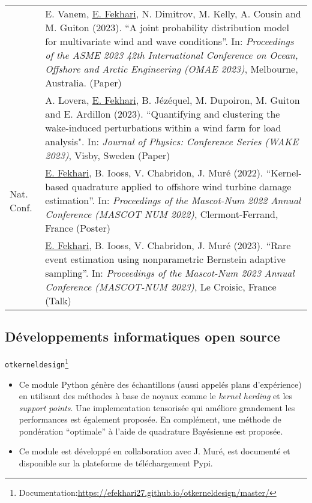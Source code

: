 \begin{center}
\begin{tabularx}{\textwidth}{l X}
                    & E. Vanem, \underline{E. Fekhari}, N. Dimitrov, M. Kelly, A. Cousin and M. Guiton (2023). 
                    ``A joint probability distribution model for multivariate wind and wave conditions''.
                    In: \textit{Proceedings of the ASME 2023 42th International Conference on Ocean, Offshore and Arctic Engineering (OMAE 2023)}, Melbourne, Australia. (Paper)\\
        
                    & A. Lovera, \underline{E. Fekhari}, B. Jézéquel, M. Dupoiron, M. Guiton and E. Ardillon (2023). 
                    ``Quantifying and clustering the wake-induced perturbations within a wind farm for load analysis". 
                    In: \textit{Journal of Physics: Conference Series (WAKE 2023)}, Visby, Sweden (Paper)\\
        \hline
        Nat. Conf.  & \underline{E. Fekhari}, B. Iooss, V. Chabridon, J. Muré (2022).
                    ``Kernel-based quadrature applied to offshore wind turbine damage estimation''. 
                    In: \textit{Proceedings of the Mascot-Num 2022 Annual Conference (MASCOT NUM 2022)}, Clermont-Ferrand, France (Poster)\\
        
                    & \underline{E. Fekhari}, B. Iooss, V. Chabridon, J. Muré (2023).
                    ``Rare event estimation using nonparametric Bernstein adaptive sampling''. 
                    In: \textit{Proceedings of the Mascot-Num 2023 Annual Conference (MASCOT-NUM 2023)}, Le Croisic, France (Talk)\\
                    
        \end{tabularx}
\end{center}

\subsection{Développements informatiques open source}

\texttt{otkerneldesign}\footnote{Documentation:\url{https://efekhari27.github.io/otkerneldesign/master/}}
\begin{itemize}
    \item[\textbullet] Ce module Python génère des échantillons (aussi appelés plans d'expérience) en utilisant des méthodes à base de noyaux comme le \textit{kernel herding} et les \textit{support points}. Une implementation tensorisée qui améliore grandement les performances est également proposée. En complément, une méthode de pondération ``optimale'' à l'aide de quadrature Bayésienne est proposée. 
    \item[\textbullet] Ce module est développé en collaboration avec J. Muré, est documenté et disponible sur la plateforme de téléchargement Pypi.
\end{itemize}

